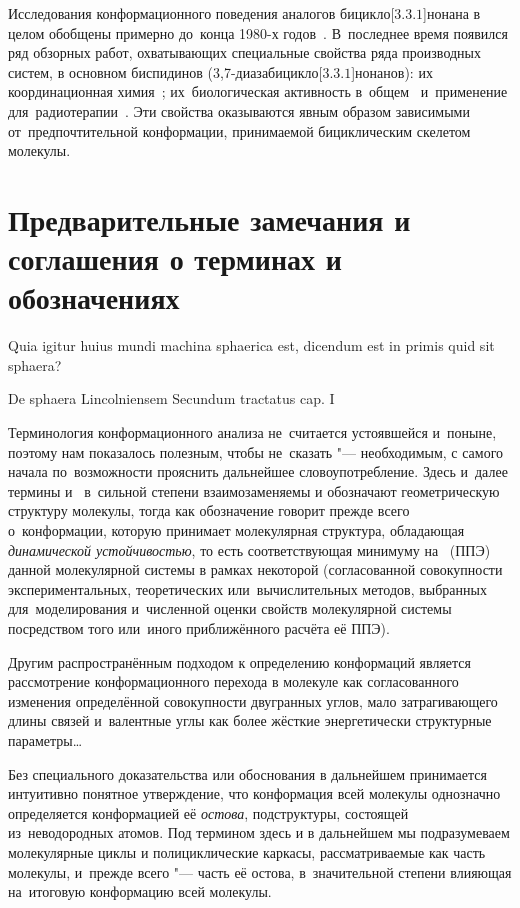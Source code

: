 Исследования конформационного поведения аналогов бицикло[$3.3.1$]\-нонана в целом обобщены примерно до~конца 1980-х годов~\cite{Zefirov:1991a}. В~последнее время появился ряд обзорных работ, охватывающих специальные свойства ряда производных систем, в основном биспидинов (3,7-диазабицикло[$3.3.1$]нонанов): их координационная химия~\cite{Comba:2007}; их~биологическая активность в~общем~\cite{Tomassoli:2016} и~применение для~радиотерапии~\cite{Comba:2018}. Эти свойства оказываются явным образом зависимыми от~предпочтительной конформации, принимаемой бициклическим скелетом молекулы.

\section{Предварительные замечания и соглашения о терминах и обозначениях}

\epigraph{Quia igitur huius mundi machina sphaerica est, dicendum est in primis quid sit sphaera?}{De sphaera Lincolniensem Secundum tractatus cap. I}

Терминология конформационного анализа не~считается устоявшейся и~поныне, поэтому нам показалось полезным, чтобы не~сказать "--- необходимым, с самого начала по~возможности прояснить дальнейшее словоупотребление. Здесь и~далее термины  и~ в~сильной степени взаимозаменяемы и обозначают геометрическую структуру молекулы, тогда как обозначение  говорит прежде всего о~конформации, которую принимает молекулярная структура, обладающая \emph{динамической устойчивостью}, то есть соответствующая минимуму на~ (ППЭ) данной молекулярной системы в рамках некоторой  (согласованной совокупности экспериментальных, теоретических или~вычислительных методов, выбранных для~моделирования и~численной оценки свойств молекулярной системы посредством того или~иного приближённого расчёта её ППЭ). 

Другим распространённым подходом к определению конформаций является рассмотрение конформационного перехода в молекуле как согласованного изменения определённой совокупности двугранных углов, мало затрагивающего длины связей и~валентные углы как более жёсткие энергетически структурные параметры\dots

Без специального доказательства или обоснования в дальнейшем принимается интуитивно понятное утверждение, что конформация всей молекулы однозначно определяется конформацией её \emph{остова}, подструктуры, состоящей из~неводородных атомов.
Под термином  здесь и в дальнейшем мы подразумеваем молекулярные циклы и полициклические каркасы, рассматриваемые как часть молекулы, и~прежде всего "--- часть её остова, в~значительной степени влияющая на~итоговую конформацию всей молекулы.

